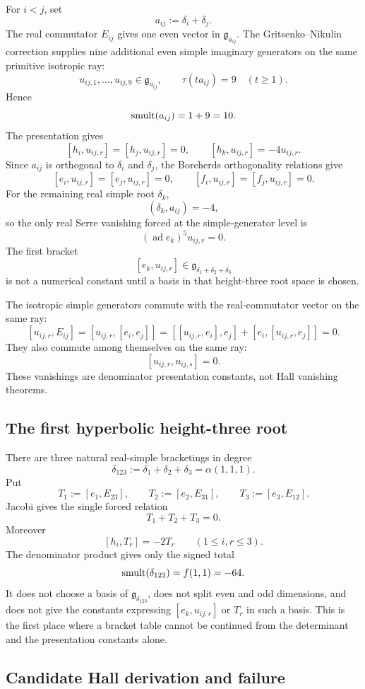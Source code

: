 For \(i<j\), set
$$
a_{ij}:=\delta_i+\delta_j.
$$
The real commutator \(E_{ij}\) gives one even vector in
\(\mathfrak g_{a_{ij}}\).  The Gritsenko--Nikulin correction supplies
nine additional even simple imaginary generators on the same primitive
isotropic ray:
$$
u_{ij,1},\ldots,u_{ij,9}\in\mathfrak g_{a_{ij}},
\qquad
\tau(ta_{ij})=9\quad(t\geq1).
$$
Hence
$$
\operatorname{smult}(a_{ij})=1+9=10.
$$
The presentation gives
$$
[h_i,u_{ij,r}]=[h_j,u_{ij,r}]=0,\qquad
[h_k,u_{ij,r}]=-4u_{ij,r}.
$$
Since \(a_{ij}\) is orthogonal to \(\delta_i\) and \(\delta_j\),
the Borcherds orthogonality relations give
$$
[e_i,u_{ij,r}]=[e_j,u_{ij,r}]=0,
\qquad
[f_i,u_{ij,r}]=[f_j,u_{ij,r}]=0.
$$
For the remaining real simple root \(\delta_k\),
$$
(\delta_k,a_{ij})=-4,
$$
so the only real Serre vanishing forced at the simple-generator level is
$$
(\operatorname{ad}e_k)^5u_{ij,r}=0.
$$
The first bracket
$$
[e_k,u_{ij,r}]
\in \mathfrak g_{\delta_1+\delta_2+\delta_3}
$$
is not a numerical constant until a basis in that height-three root
space is chosen.

The isotropic simple generators commute with the real-commutator vector
on the same ray:
$$
[u_{ij,r},E_{ij}]
=[u_{ij,r},[e_i,e_j]]
=[[u_{ij,r},e_i],e_j]+[e_i,[u_{ij,r},e_j]]
=0.
$$
They also commute among themselves on the same ray:
$$
[u_{ij,r},u_{ij,s}]=0.
$$
These vanishings are denominator presentation constants, not Hall
vanishing theorems.

\subsection{The first hyperbolic height-three root}

There are three natural real-simple bracketings in degree
$$
\delta_{123}:=\delta_1+\delta_2+\delta_3=\alpha(1,1,1).
$$
Put
$$
T_1:=[e_1,E_{23}],\qquad
T_2:=[e_2,E_{31}],\qquad
T_3:=[e_3,E_{12}].
$$
Jacobi gives the single forced relation
$$
T_1+T_2+T_3=0.
$$
Moreover
$$
[h_i,T_r]=-2T_r\qquad(1\leq i,r\leq3).
$$
The denominator product gives only the signed total
$$
\operatorname{smult}(\delta_{123})=f(1,1)=-64.
$$
It does not choose a basis of \(\mathfrak g_{\delta_{123}}\), does not
split even and odd dimensions, and does not give the constants expressing
\([e_k,u_{ij,r}]\) or \(T_r\) in such a basis.  This is the first place
where a bracket table cannot be continued from the determinant and the
presentation constants alone.

\subsection{Candidate Hall derivation and failure}

